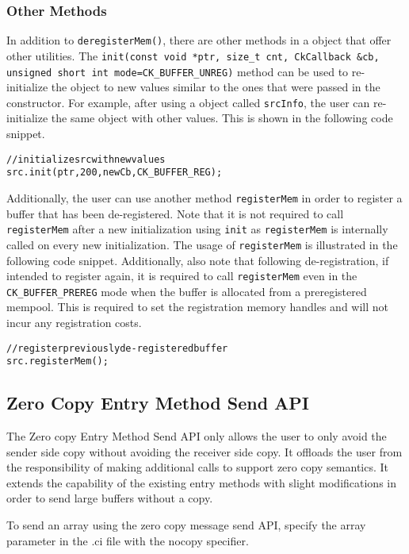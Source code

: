 \subsubsection{Other Methods}
In addition to \texttt{deregisterMem()}, there are other methods in a  object
that offer other utilities. The
{\tt init(const void *ptr, size\_t cnt, CkCallback \&cb,
unsigned short int mode=CK\_BUFFER\_UNREG)}
method can be used to re-initialize the  object to new values similar to the ones that
were passed in the constructor. For example, after using a  object called \texttt{srcInfo},
the user can re-initialize the same object with other values. This is shown in the following code snippet.

\begin{alltt}
// initialize src with new values
src.init(ptr, 200, newCb, CK_BUFFER_REG);
\end{alltt}

Additionally, the user can use another method \texttt{registerMem} in order to register a buffer that has
been de-registered. Note that it is not required to call \texttt{registerMem} after a new initialization
using \texttt{init} as \texttt{registerMem} is internally called on every new initialization. The usage of
\texttt{registerMem} is illustrated in the following code snippet. Additionally, also note that following
de-registration, if intended to register again, it is required to call \texttt{registerMem} even in the
{\tt CK\_BUFFER\_PREREG} mode when the buffer is allocated from a preregistered
mempool. This is required to set the registration memory handles and will not incur any registration costs.

\begin{alltt}
// register previously de-registered buffer
src.registerMem();
\end{alltt}

\subsection{Zero Copy Entry Method Send API}
The Zero copy Entry Method Send API only allows the user to only avoid the sender
side copy without avoiding the receiver side copy. It offloads the user from the
responsibility of making additional calls to support zero copy semantics.
It extends the capability of the existing entry methods with slight modifications
in order to send large buffers without a copy.

\vspace{0.1in}
\noindent
To send an array using the zero copy message send API, specify the array parameter
in the .ci file with the nocopy specifier.

